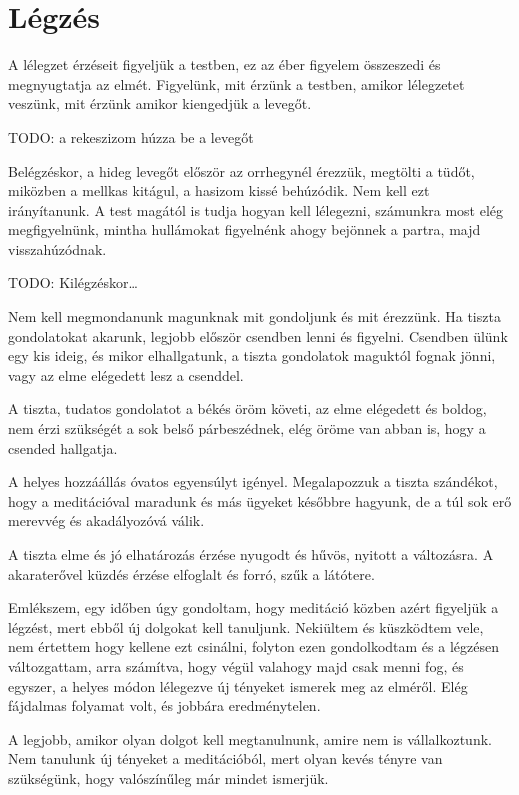 \hypertarget{luxe9gzuxe9s-1}{%
\chapter{Légzés}\label{luxe9gzuxe9s-1}}

A lélegzet érzéseit figyeljük a testben, ez az éber figyelem összeszedi
és megnyugtatja az elmét. Figyelünk, mit érzünk a testben, amikor
lélegzetet veszünk, mit érzünk amikor kiengedjük a levegőt.

TODO: a rekeszizom húzza be a levegőt

Belégzéskor, a hideg levegőt először az orrhegynél érezzük, megtölti a
tüdőt, miközben a mellkas kitágul, a hasizom kissé behúzódik. Nem kell
ezt irányítanunk. A test magától is tudja hogyan kell lélegezni,
számunkra most elég megfigyelnünk, mintha hullámokat figyelnénk ahogy
bejönnek a partra, majd visszahúzódnak.

TODO: Kilégzéskor\ldots{}

Nem kell megmondanunk magunknak mit gondoljunk és mit érezzünk. Ha
tiszta gondolatokat akarunk, legjobb először csendben lenni és figyelni.
Csendben ülünk egy kis ideig, és mikor elhallgatunk, a tiszta gondolatok
maguktól fognak jönni, vagy az elme elégedett lesz a csenddel.

A tiszta, tudatos gondolatot a békés öröm követi, az elme elégedett és
boldog, nem érzi szükségét a sok belső párbeszédnek, elég öröme van
abban is, hogy a csended hallgatja.

A helyes hozzáállás óvatos egyensúlyt igényel. Megalapozzuk a tiszta
szándékot, hogy a meditációval maradunk és más ügyeket későbbre hagyunk,
de a túl sok erő merevvég és akadályozóvá válik.

A tiszta elme és jó elhatározás érzése nyugodt és hűvös, nyitott a
változásra. A akaraterővel küzdés érzése elfoglalt és forró, szűk a
látótere.

Emlékszem, egy időben úgy gondoltam, hogy meditáció közben azért
figyeljük a légzést, mert ebből új dolgokat kell tanuljunk. Nekiültem és
küszködtem vele, nem értettem hogy kellene ezt csinálni, folyton ezen
gondolkodtam és a légzésen változgattam, arra számítva, hogy végül
valahogy majd csak menni fog, és egyszer, a helyes módon lélegezve új
tényeket ismerek meg az elméről. Elég fájdalmas folyamat volt, és
jobbára eredménytelen.

A legjobb, amikor olyan dolgot kell megtanulnunk, amire nem is
vállalkoztunk. Nem tanulunk új tényeket a meditációból, mert olyan kevés
tényre van szükségünk, hogy valószínűleg már mindet ismerjük.

